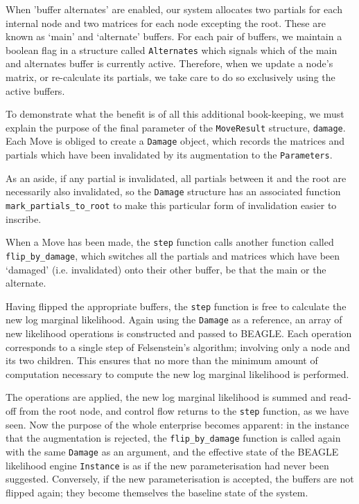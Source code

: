 \documentclass[10pt,journal,compsoc]{IEEEtran}
\begin{document}
When 'buffer alternates' are enabled, our system allocates two partials for each internal node and two matrices for each node excepting the root. These are known as `main' and `alternate' buffers. For each pair of buffers, we maintain a boolean flag in a structure called \texttt{Alternates} which signals which of the main and alternates buffer is currently active. Therefore, when we update a node's matrix, or re-calculate its partials, we take care to do so exclusively using the active buffers.

To demonstrate what the benefit is of all this additional book-keeping, we must explain the purpose of the final parameter of the \texttt{MoveResult} structure, \texttt{damage}. Each Move is obliged to create a \texttt{Damage} object, which records the matrices and partials which have been invalidated by its augmentation to the \texttt{Parameters}.

As an aside, if any partial is invalidated, all partials between it and the root are necessarily also invalidated, so the \texttt{Damage} structure has an associated function \texttt{mark\_partials\_to\_root} to make this particular form of invalidation easier to inscribe.

When a Move has been made, the \texttt{step} function calls another function called \texttt{flip\_by\_damage}, which switches all the partials and matrices which have been `damaged' (i.e. invalidated) onto their other buffer, be that the main or the alternate.

Having flipped the appropriate buffers, the \texttt{step} function is free to calculate the new log marginal likelihood. Again using the \texttt{Damage} as a reference, an array of new likelihood operations is constructed and passed to BEAGLE. Each operation corresponds to a single step of Felsenstein's algorithm; involving only a node and its two children. This ensures that no more than the minimum amount of computation necessary to compute the new log marginal likelihood is performed.

The operations are applied, the new log marginal likelihood is summed and read-off from the root node, and control flow returns to the \texttt{step} function, as we have seen. Now the purpose of the whole enterprise becomes apparent: in the instance that the augmentation is rejected, the \texttt{flip\_by\_damage} function is called again with the same \texttt{Damage} as an argument, and the effective state of the BEAGLE likelihood engine \texttt{Instance} is as if the new parameterisation had never been suggested. Conversely, if the new parameterisation is accepted, the buffers are not flipped again; they become themselves the baseline state of the system.
\end{document}
